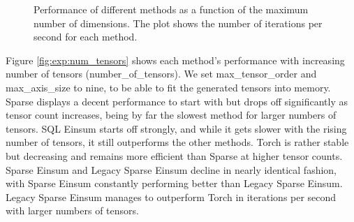 \begin{figure}[H]
    \caption{Performance of different methods as a function of the maximum number of dimensions.
        The plot shows the number of iterations per second for each method.}
    \label{fig:exp:max_num_dim}
\end{figure}

\noindent
Figure \ref{fig:exp:num_tensors} shows each method's performance with increasing number of tensors
(number\_of\_tensors). We set max\_tensor\_order and max\_axis\_size to nine,
to be able to fit the generated tensors into memory. Sparse displays a decent performance to start with but
drops off significantly as tensor count increases, being by far the slowest method for larger numbers of
tensors. SQL Einsum starts off strongly, and while it gets slower with the rising number of tensors, it
still outperforms the other methods. Torch is rather stable but decreasing and remains more efficient than
Sparse at higher tensor counts. Sparse Einsum and Legacy Sparse Einsum decline in nearly identical
fashion, with Sparse Einsum constantly performing better than Legacy Sparse Einsum. Legacy Sparse Einsum
manages to outperform Torch in iterations per second with larger numbers of tensors.

